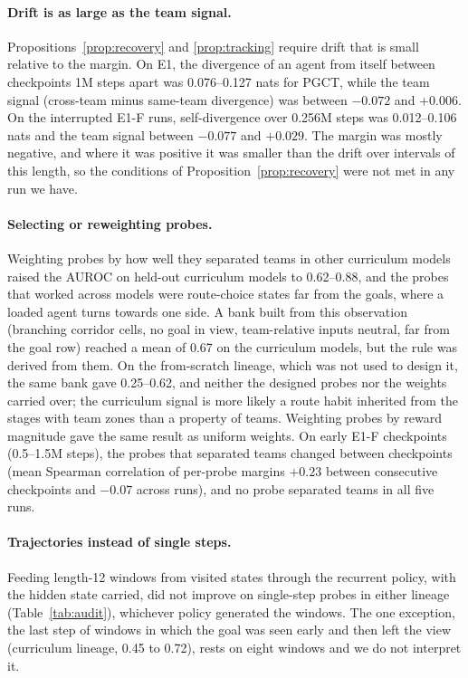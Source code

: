 \documentclass{article}
\theoremstyle{remark}
\newcommand{\ours}{PGCT}
\begin{document}
\paragraph{Drift is as large as the team signal.} Propositions~\ref{prop:recovery} and \ref{prop:tracking} require drift that
is small relative to the margin. On E1, the divergence of an agent from itself between checkpoints 1M steps apart was
0.076--0.127 nats for \ours{}, while the team signal (cross-team minus same-team divergence) was between $-0.072$ and $+0.006$.
On the interrupted E1-F runs, self-divergence over 0.256M steps was 0.012--0.106 nats and the team signal between $-0.077$
and $+0.029$. The margin was mostly negative, and where it was positive it was smaller than the drift over intervals of this
length, so the conditions of Proposition~\ref{prop:recovery} were not met in any run we have.

\paragraph{Selecting or reweighting probes.} Weighting probes by how well they separated teams in other curriculum models
raised the AUROC on held-out curriculum models to 0.62--0.88, and the probes that worked across models were route-choice states
far from the goals, where a loaded agent turns towards one side. A bank built from this observation (branching corridor
cells, no goal in view, team-relative inputs neutral, far from the goal row) reached a mean of 0.67 on the curriculum models,
but the rule was derived from them. On the from-scratch lineage, which was not used to design it, the same bank gave
0.25--0.62, and neither the designed probes nor the weights carried over; the curriculum signal is more likely a route habit
inherited from the stages with team zones than a property of teams. Weighting probes by reward magnitude gave the same result
as uniform weights. On early E1-F checkpoints (0.5--1.5M steps), the probes that separated teams changed between checkpoints
(mean Spearman correlation of per-probe margins $+0.23$ between consecutive checkpoints and $-0.07$ across runs), and no probe
separated teams in all five runs.

\paragraph{Trajectories instead of single steps.} Feeding length-12 windows from visited states through the recurrent policy,
with the hidden state carried, did not improve on single-step probes in either lineage (Table~\ref{tab:audit}), whichever
policy generated the windows. The one exception, the last step of windows in which the goal was seen early and then left the
view (curriculum lineage, 0.45 to 0.72), rests on eight windows and we do not interpret it.
\end{document}
